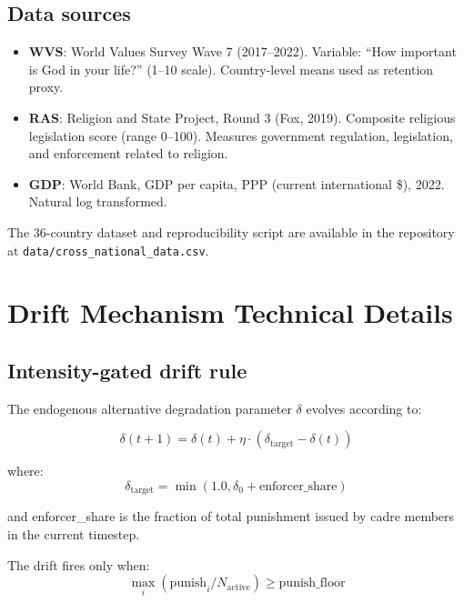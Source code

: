 \documentclass[12pt]{article}
\begin{document}
\subsection{Data sources}

\begin{itemize}
\item \textbf{WVS}: World Values Survey Wave 7 (2017--2022). Variable: ``How important is God in your life?'' (1--10 scale). Country-level means used as retention proxy.
\item \textbf{RAS}: Religion and State Project, Round 3 (Fox, 2019). Composite religious legislation score (range 0--100). Measures government regulation, legislation, and enforcement related to religion.
\item \textbf{GDP}: World Bank, GDP per capita, PPP (current international \$), 2022. Natural log transformed.
\end{itemize}

The 36-country dataset and reproducibility script are available in the repository at \texttt{data/cross\_national\_data.csv}.


\section{Drift Mechanism Technical Details}

\subsection{Intensity-gated drift rule}

The endogenous alternative degradation parameter $\delta$ evolves according to:

\begin{equation}
\delta(t+1) = \delta(t) + \eta \cdot (\delta_{\text{target}} - \delta(t))
\end{equation}

where:
\begin{equation}
\delta_{\text{target}} = \min(1.0, \delta_0 + \text{enforcer\_share})
\end{equation}

and enforcer\_share is the fraction of total punishment issued by cadre members in the current timestep.

The drift fires only when:
\begin{equation}
\max_i(\text{punish}_i / N_{\text{active}}) \geq \text{punish\_floor}
\end{equation}
\end{document}
